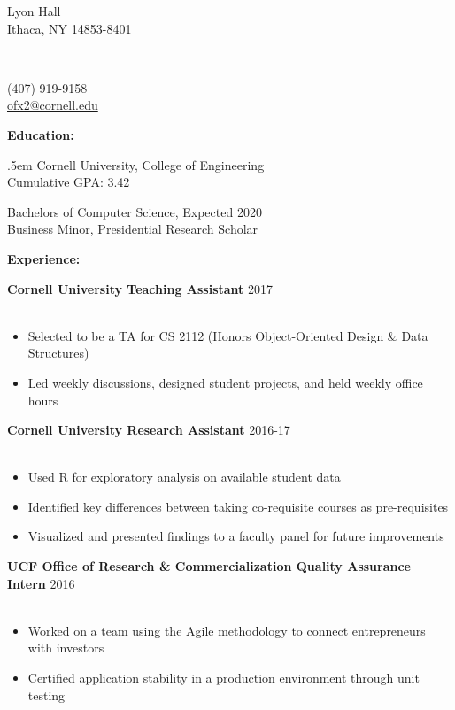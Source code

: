 \documentclass[12pt]{article}
\makeatletter
\newcommand{\name}{OLIVIA XIANG}
\newcommand{\addressPartOne}{402 Lyon Hall}
\newcommand{\addressPartTwo}{Ithaca, NY 14853-8401}
\newcommand{\phoneNumber}{(407) 919-9158}
\newcommand{\email}{ofx2@cornell.edu}
\newcommand{\gpa}{3.42}
\newcommand{\header}[5]{
	\begin{minipage}{0.3\linewidth} 
		\fontsize{12}{0} \selectfont
		#2\\[.25em]
		#3\\
		\vspace{1em} 
	\end{minipage}
	\vspace{-.75em}
	\begin{minipage}{0.4\linewidth} 
		\fontsize{16}{0} \selectfont
		\center{\textbf{#1}}\\
		\vspace{2em} 
	\end{minipage}
	\begin{minipage}{0.25\linewidth}
		\begin{flushright}
			\fontsize{12}{0} \selectfont
			#4\\[.25em]
			#5\\
			\vspace{1em} 
		\end{flushright}
	\end{minipage}
	\makebox[\linewidth]{\rule{100em}{.4pt}}
	\vspace{-.4em}
}
\newcommand{\textBody}[3]{
	\makeCaption{#1}{#2}

	\begin{minipage}{0.97\linewidth} 
		\begin{adjustwidth}{.5em}{}
			\fontsize{11}{13} \selectfont 
			#3
		\end{adjustwidth}
	\end{minipage}
	\vspace{.75em}
}
\newcommand{\captionSplitLeft}[7]{
	\makeCaption{#1}{#2}
	
	\splitLeft{#3}{#4}{#5}{#6}{#7}
}
\newcommand{\splitLeft}[5]{
	\begin{minipage}{#3\linewidth}
		\begin{adjustwidth}{#1}{}
			\fontsize{11}{12} \selectfont
			#2
		\end{adjustwidth}
	\end{minipage}
	\begin{minipage}{#5\linewidth}
		\begin{flushleft}
			\fontsize{11}{12} \selectfont 
			#4
		\end{flushleft}
	\end{minipage} 
	\vspace{1em}
}
\newcommand{\makeCaption}[2]{
	\fontsize{14}{0} \selectfont
	\textbf{#1:}
	\vspace{#2}
}
\newcommand{\group}[1]{
	\fontsize{14}{0} \selectfont
	\textbf{#1}
}
\newcommand{\jobCaption}[2]{
	\hspace{0.3em}
	\fontsize{12}{13} \selectfont
	\textbf{#1}
	\fontsize{11}{12} \selectfont 
	\hfill{#2}\\[.1em]
}
\makeatother
\begin{document}
	\header	{\name}
		{\addressPartOne}
		{\addressPartTwo}
		{\phoneNumber}
		{\href{mailto:\email}{\email}}


\begin{comment}
	\textBody	{Objective}
				{.25em}
				{Looking for opportunities that allow me to enhance my engineering skills with a focus on designing and implementing cutting-edge technical solutions to real-world problems.}
\end{comment}


	\captionSplitLeft{Education}{.4em}{.5em}
		{Cornell University, College of Engineering\\
			Cumulative GPA: \gpa}{.5}
		{Bachelors of Computer Science, Expected 2020\\
			Business Minor, Presidential Research Scholar}{.5}
	\vspace{-.4em}

	\group{Experience:}
	\vspace{.4em}
	
	
	\jobCaption{Cornell University Teaching Assistant}{2017}\\[-1.75em]
	\begin{itemize}[leftmargin=1.5cm]
		\setlength\itemsep{-.25em}
		\fontsize{11}{0} \selectfont 
	
		\item Selected to be a TA for CS 2112 (Honors Object-Oriented Design \& Data Structures)
		\item Led weekly discussions, designed student projects, and held weekly office hours
	\end{itemize}
	\vspace{.7em}

	
	\jobCaption{Cornell University Research Assistant}{2016-17}\\[-1.75em]
	\begin{itemize}[leftmargin=1.5cm]
		\setlength\itemsep{-.25em}
		\fontsize{11}{0} \selectfont 
	\item Used R for exploratory analysis on available student data
	\item Identified key differences between taking co-requisite courses as pre-requisites

\item Visualized and presented findings to a faculty panel for future improvements
	
	\end{itemize}
	
	\vspace{.7em}
\jobCaption{UCF Office of Research \& Commercialization Quality Assurance Intern}{2016}\\[-1.75em]
	\begin{itemize}[leftmargin=1.5cm]
		\setlength\itemsep{-.25em}
		\fontsize{11}{0} \selectfont 
	\item Worked on a team using the Agile methodology to connect entrepreneurs with investors
\item Certified application stability in a production environment through unit testing
	
	\end{itemize}
\end{document}
